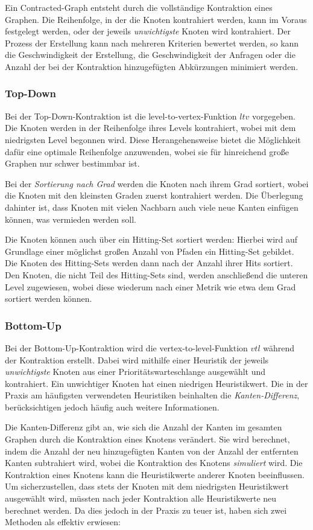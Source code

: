 Ein Contracted-Graph entsteht durch die vollständige Kontraktion eines Graphen.
Die Reihenfolge, in der die Knoten kontrahiert werden, kann im Voraus festgelegt werden, oder der jeweils \emph{unwichtigste} Knoten wird kontrahiert.
Der Prozess der Erstellung kann nach mehreren Kriterien bewertet werden, so kann die Geschwindigkeit der Erstellung, die Geschwindigkeit der Anfragen oder die Anzahl der bei der Kontraktion hinzugefügten Abkürzungen minimiert werden.

\subsubsection{Top-Down}
Bei der Top-Down-Kontraktion ist die level-to-vertex-Funktion ${ltv}$ vorgegeben.
Die Knoten werden in der Reihenfolge ihres Levels kontrahiert, wobei mit dem niedrigsten Level begonnen wird.
Diese Herangehensweise bietet die Möglichkeit dafür eine optimale Reihenfolge anzuwenden, wobei sie für hinreichend große Graphen nur schwer bestimmbar ist.

Bei der \emph{Sortierung nach Grad} werden die Knoten nach ihrem Grad sortiert, wobei die Knoten mit den kleinsten Graden zuerst kontrahiert werden.
Die Überlegung dahinter ist, dass Knoten mit vielen Nachbarn auch viele neue Kanten einfügen können, was vermieden werden soll.

Die Knoten können auch über ein Hitting-Set sortiert werden:
Hierbei wird auf Grundlage einer möglichst großen Anzahl von Pfaden ein Hitting-Set gebildet.
Die Knoten des Hitting-Sets werden dann nach der Anzahl ihrer Hits sortiert.
Den Knoten, die nicht Teil des Hitting-Sets sind, werden anschließend die unteren Level zugewiesen, wobei diese wiederum nach einer Metrik wie etwa dem Grad sortiert werden können.

\subsubsection{Bottom-Up}

Bei der Bottom-Up-Kontraktion wird die vertex-to-level-Funktion ${vtl}$ während der Kontraktion erstellt.
Dabei wird mithilfe einer Heuristik der jeweils \emph{unwichtigste} Knoten aus einer Prioritätswarteschlange ausgewählt und kontrahiert.
Ein unwichtiger Knoten hat einen niedrigen Heuristikwert.
Die in der Praxis am häufigsten verwendeten Heuristiken beinhalten die \emph{Kanten-Differenz}, berücksichtigen jedoch häufig auch weitere Informationen.

Die Kanten-Differenz gibt an, wie sich die Anzahl der Kanten im gesamten Graphen durch die Kontraktion eines Knotens verändert.
Sie wird berechnet, indem die Anzahl der neu hinzugefügten Kanten von der Anzahl der entfernten Kanten subtrahiert wird, wobei die Kontraktion des Knotens \emph{simuliert} wird.
Die Kontraktion eines Knotens kann die Heuristikwerte anderer Knoten beeinflussen.
Um sicherzustellen, dass stets der Knoten mit dem niedrigsten Heuristikwert ausgewählt wird, müssten nach jeder Kontraktion alle Heuristikwerte neu berechnet werden.
Da dies jedoch in der Praxis zu teuer ist, haben sich zwei Methoden als effektiv erwiesen:

